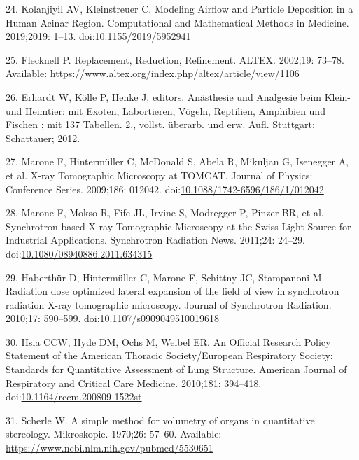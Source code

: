 \documentclass[
  american,
]{article}
\newenvironment{cslreferences}%
  {}%
  {\par}
\begin{document}
\begin{cslreferences}
\leavevmode\hypertarget{ref-6zXNR8r2}{}%
24. Kolanjiyil AV, Kleinstreuer C. Modeling Airflow and Particle Deposition in a Human Acinar Region. Computational and Mathematical Methods in Medicine. 2019;2019: 1--13. doi:\href{https://doi.org/10.1155/2019/5952941}{10.1155/2019/5952941}

\leavevmode\hypertarget{ref-199ALtdJt}{}%
25. Flecknell P. Replacement, Reduction, Refinement. ALTEX. 2002;19: 73--78. Available: \url{https://www.altex.org/index.php/altex/article/view/1106}

\leavevmode\hypertarget{ref-IdRLVLjl}{}%
26. Erhardt W, Kölle P, Henke J, editors. Anästhesie und Analgesie beim Klein- und Heimtier: mit Exoten, Labortieren, Vögeln, Reptilien, Amphibien und Fischen ; mit 137 Tabellen. 2., vollst. überarb. und erw. Aufl. Stuttgart: Schattauer; 2012.

\leavevmode\hypertarget{ref-knMAkPPz}{}%
27. Marone F, Hintermüller C, McDonald S, Abela R, Mikuljan G, Isenegger A, et al. X-ray Tomographic Microscopy at TOMCAT. Journal of Physics: Conference Series. 2009;186: 012042. doi:\href{https://doi.org/10.1088/1742-6596/186/1/012042}{10.1088/1742-6596/186/1/012042}

\leavevmode\hypertarget{ref-Cp0VRmEj}{}%
28. Marone F, Mokso R, Fife JL, Irvine S, Modregger P, Pinzer BR, et al. Synchrotron-based X-ray Tomographic Microscopy at the Swiss Light Source for Industrial Applications. Synchrotron Radiation News. 2011;24: 24--29. doi:\href{https://doi.org/10.1080/08940886.2011.634315}{10.1080/08940886.2011.634315}

\leavevmode\hypertarget{ref-VELl7OiR}{}%
29. Haberthür D, Hintermüller C, Marone F, Schittny JC, Stampanoni M. Radiation dose optimized lateral expansion of the field of view in synchrotron radiation X-ray tomographic microscopy. Journal of Synchrotron Radiation. 2010;17: 590--599. doi:\href{https://doi.org/10.1107/s0909049510019618}{10.1107/s0909049510019618}

\leavevmode\hypertarget{ref-dNc8FfNn}{}%
30. Hsia CCW, Hyde DM, Ochs M, Weibel ER. An Official Research Policy Statement of the American Thoracic Society/European Respiratory Society: Standards for Quantitative Assessment of Lung Structure. American Journal of Respiratory and Critical Care Medicine. 2010;181: 394--418. doi:\href{https://doi.org/10.1164/rccm.200809-1522st}{10.1164/rccm.200809-1522st}

\leavevmode\hypertarget{ref-KGbSQovR}{}%
31. Scherle W. A simple method for volumetry of organs in quantitative stereology. Mikroskopie. 1970;26: 57--60. Available: \url{https://www.ncbi.nlm.nih.gov/pubmed/5530651}


\end{cslreferences}
\end{document}

